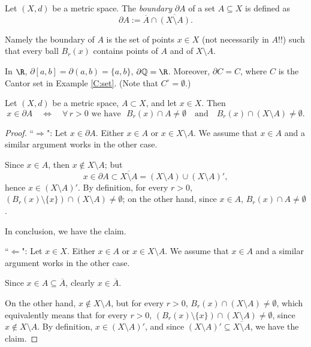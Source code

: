 \np

\begin{definition}
Let $(X,d)$ be a metric space. The \emph{boundary} $\partial A$ of a set $A \subseteq X$ is defined as
$$
\partial A:= \overline A\cap \overline{(X\setminus A)}.
$$
\end{definition}

Namely the boundary of $A$ is the set of points $x\in X$ (not necessarily in $A$!!) such that every ball $B_r(x)$ contains points of $A$ and of $X\setminus A$.

\bis

\begin{example}
In $\R$, $\partial [a,b] = \partial (a,b) = \{a,b\}$, $\partial \mathbb{Q} = \R$. Moreover, $\partial C= C$, where $C$ is the Cantor set in Example \ref{C:set}. 
(Note that $C^\circ = \emptyset$.)

\end{example}

\bis

\begin{theorem}
Let $(X,d)$ be a metric space, $A\subset X$, and let $x\in X$. Then
$$
x\in \partial A \quad \Leftrightarrow \quad \forall \, r>0 \,\, \textrm{we have } \,\, B_r(x)\cap A\neq \emptyset \quad \textrm{and} \quad B_r(x)\cap (X\setminus A)\neq \emptyset.
$$
\end{theorem}

\np

\begin{proof}
``$\Rightarrow$": Let $x\in \partial A$. Either $x\in A$ or $x\in X\setminus A$. We assume that $x\in A$ and a similar argument works in the other case.

Since $x\in A$, then $x\notin X\setminus A$; but 
$$
x\in \partial A\subset \overline{X\setminus A} = (X\setminus A)\cup (X\setminus A)',
$$
hence $x\in (X\setminus A)'$. By definition, for every $r>0$, $(B_r(x)\setminus \{x\})\cap (X\setminus A)\neq \emptyset$; on the other hand, since 
$x\in A$, $B_r(x)\cap A\neq \emptyset$.

In conclusion, we have the claim.
\bis

``$\Leftarrow$": Let $x\in X$. Either $x\in A$ or $x\in X\setminus A$. We assume that $x\in A$ and a similar argument works in the other case.

Since $x\in A\subseteq \overline A$, clearly $x\in \overline A$.

On the other hand, $x\notin X\setminus A$, but for every $r>0$, $B_r(x) \cap (X\setminus A) \neq \emptyset$, which equivalently means that 
for every $r>0$, $(B_r(x)\setminus \{x\})\cap (X\setminus A)\neq \emptyset$, since $x\notin X\setminus A$. By definition, $x\in (X\setminus A)'$, 
and since $(X\setminus A)'\subseteq \overline{X\setminus A}$, we have the claim.
\end{proof}

